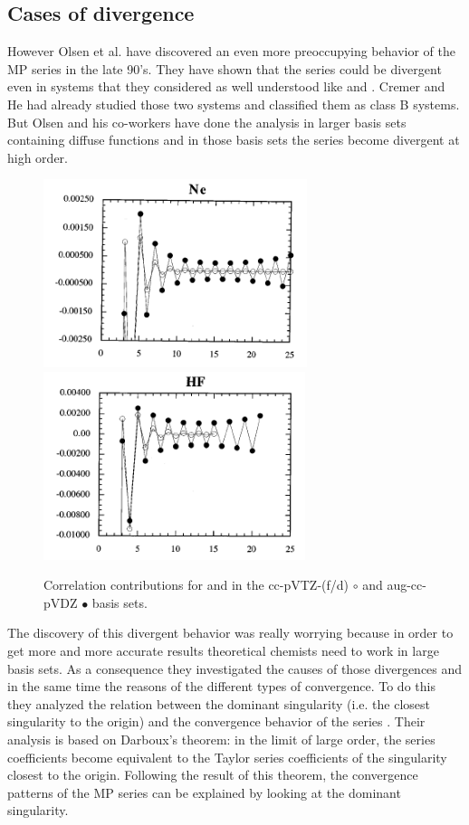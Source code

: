 \documentclass[11pt,a4paper]{article}
\begin{document}
{\subsection{Cases of divergence}

However Olsen et al. have discovered an even more preoccupying behavior of the MP series in the late 90's. They have shown that the series could be divergent even in systems that they considered as well understood like  and  \cite{Olsen_1996, Christiansen_1996}. Cremer and He had already studied those two systems and classified them as class B systems. But Olsen and his co-workers have done the analysis in larger basis sets containing diffuse functions and in those basis sets the series become divergent at high order.

\begin{figure}[h!]
    \includegraphics[height=5.5cm]{Nedivergence.png}
    \hfill
    \includegraphics[height=5.5cm]{HFdivergence.png}
    \hfill
    \caption{\centering Correlation contributions for  and  in the cc-pVTZ-(f/d) $\circ$ and aug-cc-pVDZ $\bullet$ basis sets.}
    \label{fig:my_label}
\end{figure}

The discovery of this divergent behavior was really worrying because in order to get more and more accurate results theoretical chemists need to work in large basis sets. As a consequence they investigated the causes of those divergences and in the same time the reasons of the different types of convergence. To do this they analyzed the relation between the dominant singularity (i.e. the closest singularity to the origin) and the convergence behavior of the series \cite{Olsen_2000}. Their analysis is based on Darboux's theorem: in the limit of large order, the series coefficients become equivalent to the Taylor series coefficients of the singularity closest to the origin. Following the result of this theorem, the convergence patterns of the MP series can be explained by looking at the dominant singularity.

}
\end{document}
